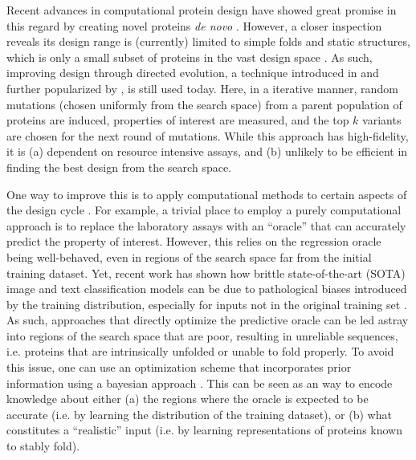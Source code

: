 \documentclass{article}
\begin{document}
Recent advances in computational protein design have showed great promise in
this regard by creating novel proteins \textit{de novo} \cite{huang2016coming}.
However, a closer inspection reveals its design range is (currently) limited to
simple folds and static structures, which is only a small subset of proteins in
the vast design space \cite{pierce2002protein}. As such, improving design
through directed evolution, a technique introduced in \cite{chen1991enzyme} and
further popularized by \cite{romero2009exploring}, is still used today. Here, in
a iterative manner, random mutations (chosen uniformly from the search space)
from a parent population of proteins are induced, properties of interest are
measured, and the top $k$ variants are chosen for the next round of mutations.
While this approach has high-fidelity, it is (a) dependent on resource intensive
assays, and (b) unlikely to be efficient in finding the best design from the
search space.

One way to improve this is to apply computational methods to certain aspects of
the design cycle \cite{gomez2018automatic, schneider1998peptide, biswas2020low,
yang2018machine, alley2019unified}. For example, a trivial place to employ a
purely computational approach is to replace the laboratory assays with an
``oracle'' that can accurately predict the property of interest. However, this
relies on the regression oracle being well-behaved, even in regions of the
search space far from the initial training dataset. Yet, recent work has shown
how brittle state-of-the-art (SOTA) image \cite{moosavi2016deepfool,
nguyen2015deep} and text \cite{liang2017deep, behjati2019universal}
classification models can be due to pathological biases introduced by the
training distribution, especially for inputs not in the original training set
\cite{amini2019uncovering, cisse2017houdini}. As such, approaches that directly
optimize the predictive oracle can be led astray into regions of the search
space that are poor, resulting in unreliable sequences, i.e. proteins that are
intrinsically unfolded or unable to fold properly. To avoid this issue, one can
use an optimization scheme that incorporates prior information using a bayesian
approach \cite{gunawan2006bayesian, mockus2012bayesian}. This can be seen as an
way to encode knowledge about either (a) the regions where the oracle is
expected to be accurate (i.e. by learning the distribution of the training
dataset), or (b) what constitutes a ``realistic'' input (i.e. by learning
representations of proteins known to stably fold).
\end{document}
